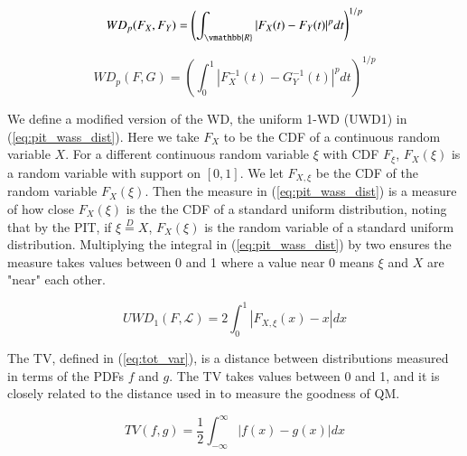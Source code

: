 \documentclass[preprint,12pt,authoryear]{elsarticle}
\begin{document}
\begin{equation}
    \label{eq:wass_dist_cdf}
    WD_p (F_X, F_Y) = \left( \int_{\vmathbb{R}} |F_X(t) - F_Y(t)|^p dt\right)^{1/p}
\end{equation}

\begin{equation}
    \label{eq:wass_dist_quant}
    WD_p (F, G) = \left( \int_0^1 |F^{-1}_X(t) - G^{-1}_Y(t)|^p dt \right)^{1/p}
\end{equation}

We define a modified version of the WD, the uniform 1-WD (UWD1) in (\ref{eq:pit_wass_dist}). Here we take $F_X$ to be the CDF of a continuous random variable $X$. For a different continuous random variable $\xi$ with CDF $F_{\xi}$, $F_X(\xi)$ is a random variable with support on $[0,1]$. We let $F_{X,\xi}$ be the CDF of the random variable $F_X(\xi)$. Then the measure in (\ref{eq:pit_wass_dist}) is a measure of how close $F_X(\xi)$ is the the CDF of a standard uniform distribution, noting that by the PIT, if $\xi \overset{D}{=} X$, $F_X(\xi)$ is the random variable of a standard uniform distribution. Multiplying the integral in (\ref{eq:pit_wass_dist}) by two ensures the measure takes values between 0 and 1 \cite[]{645854} where a value near 0 means $\xi$ and $X$ are "near" each other.

\begin{equation}
    \label{eq:pit_wass_dist}
    UWD_1(F, \mathcal{L}) = 2\int_0^1 |F_{X,\xi} (x) - x|dx
\end{equation}



The TV, defined in (\ref{eq:tot_var}), is a distance between distributions measured in terms of the PDFs $f$ and $g$. The TV takes values between 0 and 1, and it is closely related to the distance used in \cite{sgouropoulos2015matching} to measure the goodness of QM.  

\begin{equation}
    \label{eq:tot_var}
    TV(f,g) = \frac{1}{2} \int_{-\infty}^{\infty}|f(x) - g(x) | dx
\end{equation}

\end{document}
